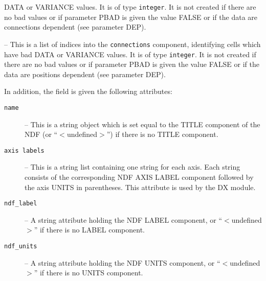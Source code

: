 {{\begin{description}
      DATA or VARIANCE values. It is of type {\tt integer}. It is not
      created if there are no bad values or if parameter PBAD is given
      the value FALSE or if the data are connections dependent (see
      parameter DEP).
      \item [{\tt invalid connections}] -- This is a list of indices into
      the {\tt connections} component, identifying cells which have bad 
      DATA or VARIANCE values. It is of type {\tt integer}. It is not
      created if there are no bad values or if parameter PBAD is given
      the value FALSE or if the data are positions dependent (see
      parameter DEP).
      \end{description}

      In addition, the field is given the following attributes:
      \begin{description}
      \item [{\tt name}] -- This is a string object which is set equal to
      the TITLE component of the NDF (or ``$<$undefined$>$'') if there is no TITLE
      component.
      \item [{\tt axis labels}] -- This is a string list containing one
      string for each axis. Each string consists of the corresponding NDF AXIS 
      LABEL component followed by the axis UNITS in parentheses. This
      attribute is used by the DX  module.
      \item [{\tt ndf\_label}] -- A string attribute holding the NDF LABEL
      component, or ``$<$undefined$>$'' if there is no LABEL component.
      \item [{\tt ndf\_units}] -- A string attribute holding the NDF UNITS
      component, or ``$<$undefined$>$'' if there is no UNITS component.
      \end{description}
      

}}
